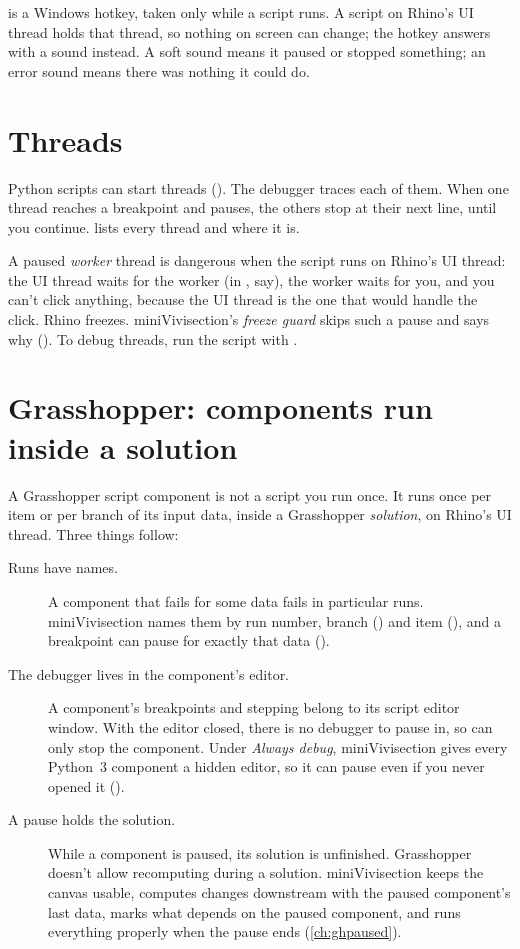  is a Windows hotkey, taken only while a script runs. A script on Rhino's UI thread
holds that thread, so nothing on screen can change; the hotkey answers with a sound instead. A soft
sound means it paused or stopped something; an error sound means there was nothing it could do.

\section{Threads}\label{sec:threadsconcept}

Python scripts can start threads (). The debugger traces each of them. When one
thread reaches a breakpoint and pauses, the others stop at their next line, until you continue.
 lists every thread and where it is.

A paused \emph{worker} thread is dangerous when the script runs on Rhino's UI thread: the UI thread
waits for the worker (in , say), the worker waits for you, and you can't click anything,
because the UI thread is the one that would handle the click. Rhino freezes. miniVivisection's
\emph{freeze guard} skips such a pause and says why (). To debug threads, run
the script with .

\section{Grasshopper: components run inside a solution}\label{sec:ghconcept}

A Grasshopper script component is not a script you run once. It runs once per item or per branch of
its input data, inside a Grasshopper \emph{solution}, on Rhino's UI thread. Three things follow:

\begin{description}
  \item[Runs have names.] A component that fails for some data fails in particular runs. miniVivisection
        names them by run number, branch () and item (), and a breakpoint can
        pause for exactly that data ().
  \item[The debugger lives in the component's editor.] A component's breakpoints and stepping belong to
        its script editor window. With the editor closed, there is no debugger to pause in, so
         can only stop the component. Under \emph{Always debug}, miniVivisection gives
        every Python~3 component a hidden editor, so it can pause even if you never opened it
        ().
  \item[A pause holds the solution.] While a component is paused, its solution is unfinished.
        Grasshopper doesn't allow recomputing during a solution. miniVivisection keeps the canvas usable,
        computes changes downstream with the paused component's last data, marks what depends on the
        paused component, and runs everything properly when the pause ends (\cref{ch:ghpaused}).
\end{description}

